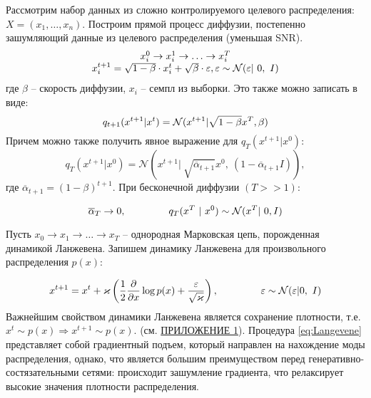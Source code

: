 \par
Рассмотрим набор данных из сложно контролируемого целевого распределения: $X = (x_1, \ldots, x_n)$. Построим прямой процесс диффузии, постепенно зашумляющий данные из целевого распределения (уменьшая SNR).
\[
    \begin{array}{c}
        x_i^0 \to x_i^1 \to \ldots \to x_i^T\\
        x_i^{t+1} = \sqrt{1-\beta}\cdot x_i^t + \sqrt{\beta}\cdot \varepsilon, \hfill \varepsilon \sim \mathcal{N}(\varepsilon| \ 0, \ I)
    \end{array}
\]
где $\beta$ -- скорость диффузии, $x_i$ -- семпл из выборки. Это также можно записать в виде:
\[
    q_{t+1} (x^{t+1}|x^t) = \mathcal{N}(x^{t+1} | \sqrt{1 - \beta}x^T, \beta)\\
\]
Причем можно также получить явное выражение для $q_T (x^{t+1} | x^0)$:
\[
    q_T (x^{t+1} | x^0) = \mathcal{N}(x^{t+1}| \ \sqrt{\overline{\alpha}_{t+1}}x^0, \ (1 - \overline{\alpha}_{t+1}I)),
\]
где $\overline{\alpha}_{t+1} = (1 - \beta)^{t+1}$. При бесконечной диффузии $(T >> 1):$

\[
    \overline{\alpha}_T \to 0, \hspace*{1.5cm} q_T(x^T \ | \ x^0) \sim \mathcal{N}(x^T| \ 0, I)  
\]



\par
Пусть $x_0 \to x_1 \to \ldots \to x_T$ -- однородная Марковская цепь, порожденная динамикой Ланжевена. Запишем динамику Ланжевена для произвольного распределения $p(x)$:

\begin{equation}
    \label{eq:Langevene}
    x^{t+1} = x^t + \varkappa \left(\dfrac{1}{2} \dfrac{\partial }{\partial x} \log p(x) + \dfrac{\varepsilon}{\sqrt{\varkappa}}\right), \hspace*{1.5cm} \varepsilon \sim \mathcal{N}(\varepsilon | 0,\ I)
\end{equation}
Важнейшим свойством динамики Ланжевена является сохранение плотности, т.е. $x^t \sim p(x) \Rightarrow x^{t+1} \sim p(x)$. (см. \hyperref[AppendixA]{ПРИЛОЖЕНИЕ 1}). 
Процедура \ref{eq:Langevene} представляет собой градиентный подъем, который направлен на нахождение моды распределения, однако, что является большим преимуществом перед генеративно-состязательными сетями: происходит зашумление градиента, что релаксирует высокие значения плотности распределения. 

\par



